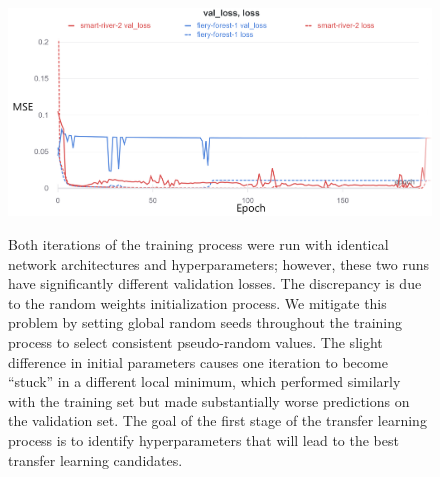 \begin{figure}
    \centering
    \includegraphics[width=\linewidth]{Chapters/Figures/best-params-meta1.png}
    \label{fig:meta-1-best}
    \caption[Learning Curve for the best hyperparameters]{Both iterations of the training process were run with identical network architectures and hyperparameters; however, these two runs have significantly different validation losses. The discrepancy is due to the random weights initialization process. We mitigate this problem by setting global random seeds throughout the training process to select consistent pseudo-random values. The slight difference in initial parameters causes one iteration to become ``stuck'' in a different local minimum, which performed similarly with the training set but made substantially worse predictions on the validation set. The goal of the first stage of the transfer learning process is to identify hyperparameters that will lead to the best transfer learning candidates.}
\end{figure}



